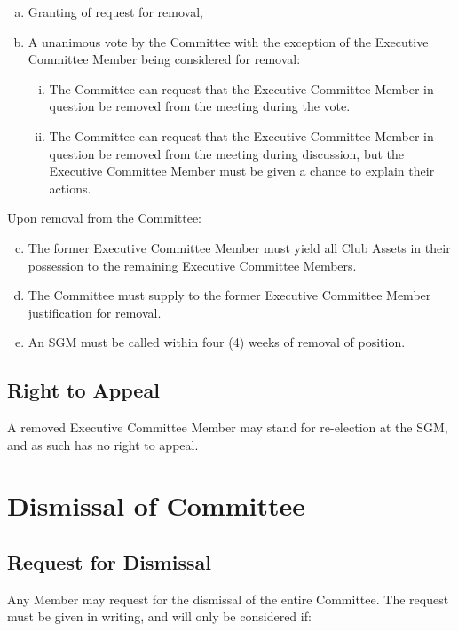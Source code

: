\documentclass[a4paper,12pt]{article}
\begin{document}
\begin{enumerate}[a)]
	\item Granting of request for removal,
	\item A unanimous vote by the Committee with the exception of the Executive Committee Member being considered for removal:
	\begin{enumerate}[i)]
		\item The Committee can request that the Executive Committee Member in question be removed from the meeting during the vote.
		\item The Committee can request that the Executive Committee Member in question be removed from the meeting during discussion, but the Executive Committee Member must be given a chance to explain their actions.
	\end{enumerate}
\end{enumerate}

Upon removal from the Committee:

\begin{enumerate}[a)]
	\setcounter{enumi}{2}
	\item The former Executive Committee Member must yield all Club Assets in their possession to the remaining Executive Committee Members.
	\item The Committee must supply to the former Executive Committee Member justification for removal.
	\item An SGM must be called within four (4) weeks of removal of position.
\end{enumerate}

\subsection{Right to Appeal}

A removed Executive Committee Member may stand for re-election at the SGM, and as such has no right to appeal.

\section{Dismissal of Committee}

\subsection{Request for Dismissal}

Any Member may request for the dismissal of the entire Committee. The request must be given in writing, and will only be considered if:
\end{document}
